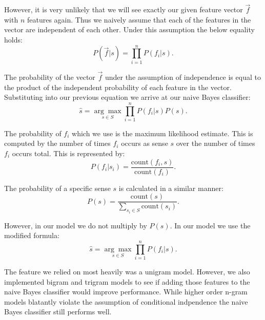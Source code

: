 \documentclass[11pt]{article}
\newcommand{\cou}{\textrm{count}}
\begin{document}
However, it is very unlikely that we will see exactly our given feature vector $\vec{f}$ with $n$ features again. Thus we naively assume that each of the features in the vector are independent of each other. Under this assumption the below equality holds:
\[P(\vec{f}|s) = \prod_{i=1}^n P(f_i|s).\]

The probability of the vector $\vec{f}$ under the assumption of independence is equal to the product of the independent probability of each feature in the vector. Substituting into our previous equation we arrive at our naive Bayes classifier:
\[\hat{s} = \underset{s \in S}{\arg\max}{{\prod_{i=1}^n}P(f_i|s)}P(s).\]

The probability of ${f_i}$ which we use is the maximum likelihood estimate. This is computed by the number of times $f_i$ occurs as sense $s$ over the number of times $f_i$ occurs total. 
This is represented by:
\[P(f_i|s_i) = \frac{\cou(f_i,s)}{\cou(f_i)}.\]

The probability of a specific sense $s$ is calculated in a similar manner:
$$P(s) = \frac{\cou(s)}{\underset{s_i \in S}{\sum} \cou(s_i)}.$$

However, in our model we do not multiply by $P(s)$. In our model we use the modified formula:
\[\hat{s} = \underset{s \in S}{\arg\max}{{\prod_{i=1}^n}P(f_i|s)}.\]

The feature we relied on most heavily was a unigram model. However, we also implemented bigram and trigram models to see if adding those features to the naive Bayes classifier would improve performance. While higher order n-gram models blatantly violate the assumption of conditional indpendence the naive Bayes classifier still performs well.
\end{document}
